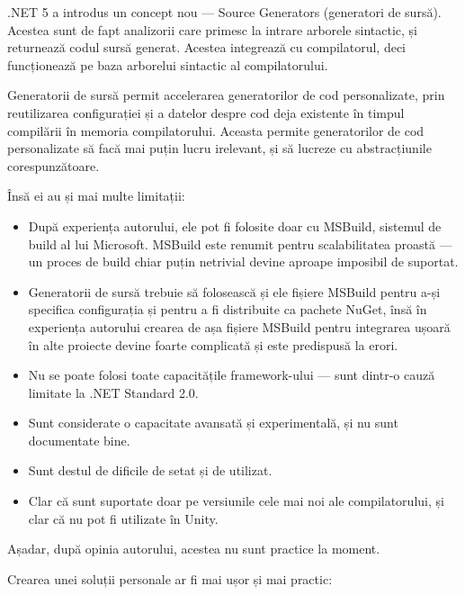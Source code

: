 \documentclass[a4paper,12pt]{report}
\begin{document}
{{.}NET} 5 a introdus un concept nou --- Source Generators (generatori de sursă)\cite{source_generators}.
Acestea sunt de fapt analizorii care primesc la intrare arborele sintactic, și returnează codul sursă generat.
Acestea integrează cu compilatorul, deci funcționează pe baza arborelui sintactic al compilatorului.

Generatorii de sursă permit accelerarea generatorilor de cod personalizate, prin reutilizarea configurației și a datelor despre cod deja existente în timpul compilării în memoria compilatorului.
Aceasta permite generatorilor de cod personalizate să facă mai puțin lucru irelevant, și să lucreze cu abstracțiunile corespunzătoare.

Însă ei au și mai multe limitații:

\begin{itemize}

  \item După experiența autorului, ele pot fi folosite doar cu MSBuild, sistemul de build al lui Microsoft.
  MSBuild este renumit pentru scalabilitatea proastă --- un proces de build chiar puțin netrivial devine aproape imposibil de suportat.

  \item Generatorii de sursă trebuie să folosească și ele fișiere MSBuild pentru a-și specifica configurația\cite{source_generators_msbuild_configuration} și pentru a fi distribuite ca pachete NuGet, 
    însă în experiența autorului crearea de așa fișiere MSBuild pentru integrarea ușoară în alte proiecte devine foarte complicată și este predispusă la erori.

  \item Nu se poate folosi toate capacitățile framework-ului --- sunt dintr-o cauză limitate la {{.}NET} Standard 2.0.

  \item Sunt considerate o capacitate avansată și experimentală, și nu sunt documentate bine.

  \item Sunt destul de dificile de setat și de utilizat.
    
  \item Clar că sunt suportate doar pe versiunile cele mai noi ale compilatorului, și clar că nu pot fi utilizate în Unity.

\end{itemize}

Așadar, după opinia autorului, acestea nu sunt practice la moment.

Crearea unei soluții personale ar fi mai ușor și mai practic:
\end{document}
